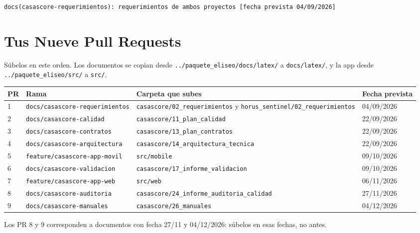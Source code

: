 \documentclass[11pt,a4paper]{article}
\begin{document}
\begin{lstlisting}
docs(casascore-requerimientos): requerimientos de ambos proyectos [fecha prevista 04/09/2026]
\end{lstlisting}

\section{Tus Nueve Pull Requests}
Súbelos en este orden. Los documentos se copian desde \nolinkurl{../paquete_eliseo/docs/latex/} a \nolinkurl{docs/latex/}, y la app desde \nolinkurl{../paquete_eliseo/src/} a \nolinkurl{src/}.

\vspace{0.1cm}
{\small
{}
\noindent\begin{tabularx}{\textwidth}{@{}C{0.6cm} P{4.6cm} L C{1.8cm}@{}}
\toprule
{}
\textbf{PR} & \textbf{Rama} & \textbf{Carpeta que subes} & \textbf{Fecha prevista} \\
 & \nolinkurl{docs/casascore-requerimientos} & \nolinkurl{casascore/02_requerimientos} y \nolinkurl{horus_sentinel/02_requerimientos} & 04/09/2026 \\
2 & \nolinkurl{docs/casascore-calidad} & \nolinkurl{casascore/11_plan_calidad} & 22/09/2026 \\
3 & \nolinkurl{docs/casascore-contratos} & \nolinkurl{casascore/13_plan_contratos} & 22/09/2026 \\
4 & \nolinkurl{docs/casascore-arquitectura} & \nolinkurl{casascore/14_arquitectura_tecnica} & 22/09/2026 \\
5 & \nolinkurl{feature/casascore-app-movil} & \nolinkurl{src/mobile} & 09/10/2026 \\
6 & \nolinkurl{docs/casascore-validacion} & \nolinkurl{casascore/17_informe_validacion} & 09/10/2026 \\
7 & \nolinkurl{feature/casascore-app-web} & \nolinkurl{src/web} & 06/11/2026 \\
8 & \nolinkurl{docs/casascore-auditoria} & \nolinkurl{casascore/24_informe_auditoria_calidad} & 27/11/2026 \\
9 & \nolinkurl{docs/casascore-manuales} & \nolinkurl{casascore/26_manuales} & 04/12/2026 \\
\bottomrule
\end{tabularx}
}

\vspace{0.1cm}
\noindent Los PR 8 y 9 corresponden a documentos con fecha 27/11 y 04/12/2026: súbelos en esas fechas, no antes.
\end{document}
